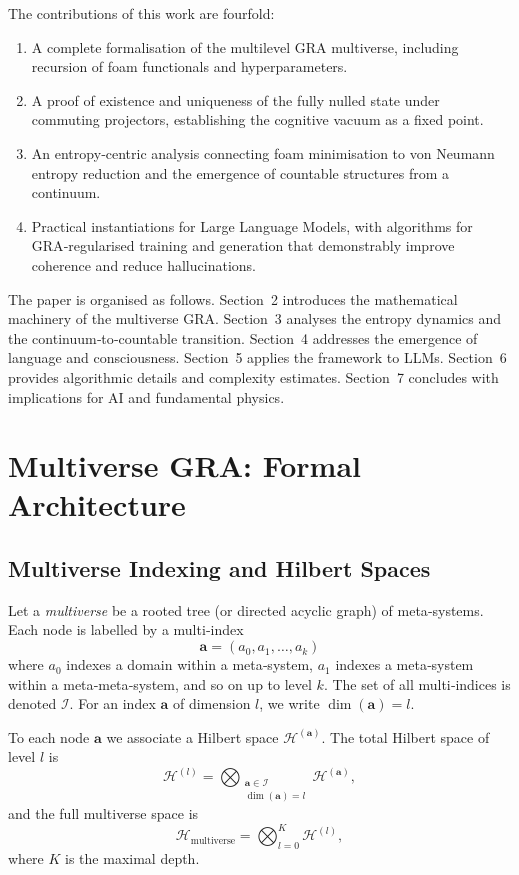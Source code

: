 \documentclass[11pt]{article}
\newcommand{\cH}{\mathcal{H}}
\newcommand{\cI}{\mathcal{I}}
\begin{document}
The contributions of this work are fourfold:
\begin{enumerate}
    \item A complete formalisation of the multilevel GRA multiverse, including recursion of foam functionals and hyperparameters.
    \item A proof of existence and uniqueness of the fully nulled state under commuting projectors, establishing the cognitive vacuum as a fixed point.
    \item An entropy‑centric analysis connecting foam minimisation to von Neumann entropy reduction and the emergence of countable structures from a continuum.
    \item Practical instantiations for Large Language Models, with algorithms for GRA‑regularised training and generation that demonstrably improve coherence and reduce hallucinations.
\end{enumerate}

The paper is organised as follows. Section~2 introduces the mathematical machinery of the multiverse GRA. Section~3 analyses the entropy dynamics and the continuum‑to‑countable transition. Section~4 addresses the emergence of language and consciousness. Section~5 applies the framework to LLMs. Section~6 provides algorithmic details and complexity estimates. Section~7 concludes with implications for AI and fundamental physics.

\section{Multiverse GRA: Formal Architecture}
\label{sec:gra}

\subsection{Multiverse Indexing and Hilbert Spaces}
Let a \emph{multiverse} be a rooted tree (or directed acyclic graph) of meta‑systems. Each node is labelled by a multi‑index 
\[
\mathbf{a} = (a_0, a_1, \dots, a_k)
\]
where $a_0$ indexes a domain within a meta‑system, $a_1$ indexes a meta‑system within a meta‑meta‑system, and so on up to level $k$. The set of all multi‑indices is denoted $\cI$. For an index $\mathbf{a}$ of dimension $l$, we write $\dim(\mathbf{a}) = l$.

To each node $\mathbf{a}$ we associate a Hilbert space $\cH^{(\mathbf{a})}$. The total Hilbert space of level $l$ is
\[
\cH^{(l)} = \bigotimes_{\substack{\mathbf{a} \in \cI \\ \dim(\mathbf{a})=l}} \cH^{(\mathbf{a})},
\]
and the full multiverse space is
\[
\cH_{\text{multiverse}} = \bigotimes_{l=0}^{K} \cH^{(l)},
\]
where $K$ is the maximal depth.
\end{document}
